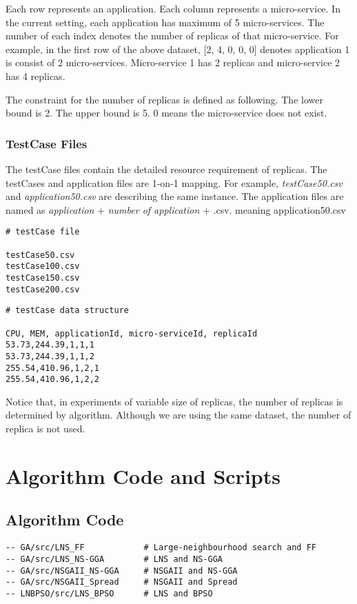 Each row represents an application. 
Each column represents a micro-service. In the current setting, each
application has maximum of 5 micro-services. The number of each index denotes the number of replicas of that micro-service. For example, in the first row of the above dataset, [2, 4, 0, 0, 0] 
denotes application 1 is consist of 2 micro-services. Micro-service 1 has 2 replicas and micro-service 2 has 4 replicas.

The constraint for the number of replicas is defined as following. 
The lower bound is 2. 
The upper bound is 5.
0 means the micro-service does not exist.

 
\subsubsection{TestCase Files}

The testCase files contain the detailed resource requirement of replicas.
The testCases and application files are 1-on-1 mapping. 
For example, \textit{testCase50.csv} and \textit{application50.csv} are describing the same instance. 
The application files are named as \textit{application} + \textit{number of application} + .csv.
 meaning application50.csv
\begin{lstlisting}
# testCase file 

testCase50.csv
testCase100.csv
testCase150.csv
testCase200.csv
\end{lstlisting}



\begin{lstlisting}
# testCase data structure

CPU, MEM, applicationId, micro-serviceId, replicaId
53.73,244.39,1,1,1
53.73,244.39,1,1,2
255.54,410.96,1,2,1
255.54,410.96,1,2,2
\end{lstlisting}

Notice that, in experiments of variable size of replicas, the number of
replicas is determined by algorithm. Although we are using the same dataset,
the number of replica is not used. 


\section{Algorithm Code and Scripts}

\subsection{Algorithm Code}
\begin{lstlisting}
-- GA/src/LNS_FF        	# Large-neighbourhood search and FF
-- GA/src/LNS_NS-GGA    	# LNS and NS-GGA
-- GA/src/NSGAII_NS-GGA 	# NSGAII and NS-GGA
-- GA/src/NSGAII_Spread 	# NSGAII and Spread
-- LNBPSO/src/LNS_BPSO		# LNS and BPSO
\end{lstlisting}
